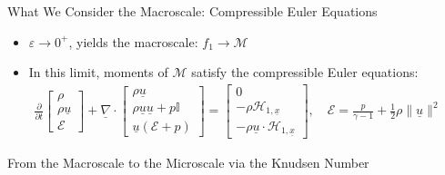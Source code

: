 \documentclass[final,hyperref={pdfpagelabels=false}]{beamer}
\newcommand{\bunderline}[1]{\underline{#1}}
\renewcommand{\vec}[1]{{\bunderline{#1}}}
\begin{document}
\begin{frame}[t]
\begin{columns}[t]
\begin{column}{.02\textwidth}\end{column} %

\begin{column}{.31\textwidth} %

\begin{block}{What We Consider the Macroscale: Compressible Euler Equations}

\begin{itemize}
\item $\varepsilon \rightarrow 0^+$, yields
the macroscale: \quad $f_1 \rightarrow {\mathcal M}$

\item In this limit, moments of ${\mathcal M}$ satisfy the compressible Euler equations:
\begin{gather*}
\frac{\partial}{\partial t} 
\begin{bmatrix} \rho \\ \rho \vec{u} \\ {\mathcal E} \end{bmatrix}
+
\vec{\nabla} \cdot
\begin{bmatrix} \rho \vec{u} \\ \rho \vec{u} \vec{u} + p {\mathbb I} \\ 
\vec{u} \left( {\mathcal E} + p \right) \end{bmatrix} = \begin{bmatrix} 
0 \\ - \rho {\mathcal H}_{1,\vec{x}} \\ -\rho \vec{u} \cdot {\mathcal H}_{1,\vec{x}}
\end{bmatrix}, \quad
{\mathcal E} = \frac{p}{\gamma - 1} + \frac{1}{2} \rho \| \vec{u} \|^2
\end{gather*}
\end{itemize}

\end{block}

\begin{block}{From the Macroscale to the Microscale via the Knudsen Number}


\end{block}
\end{column}
\end{columns}
\end{frame}
\end{document}
